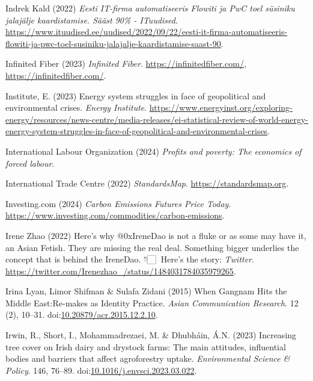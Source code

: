 \documentclass[
  letterpaper,
  DIV=11,
  numbers=noendperiod]{scrartcl}
\newlength{\cslhangindent}
\newenvironment{CSLReferences}[2] %
 {\begin{list}{}{%
  \setlength{\itemindent}{0pt}
  \setlength{\leftmargin}{0pt}
  \setlength{\parsep}{0pt}
  \ifodd #1
   \setlength{\leftmargin}{\cslhangindent}
   \setlength{\itemindent}{-1\cslhangindent}
  \fi
  \setlength{\itemsep}{#2\baselineskip}}}
 {\end{list}}
\begin{document}
\begin{CSLReferences}{0}{1}
Indrek Kald (2022) \emph{Eesti {IT-firma} automatiseeris {Flowiti} ja
{PwC} toel s{ü}siniku jalaj{ä}lje kaardistamise. {S{ä}{ä}st} 90\% -
{ITuudised}}.
\url{https://www.ituudised.ee/uudised/2022/09/22/eesti-it-firma-automatiseeris-flowiti-ja-pwc-toel-susiniku-jalajalje-kaardistamise-saast-90}.

Infinited Fiber (2023) \emph{Infinited {Fiber}}.
\href{https://infinitedfiber.com/,\%20https://infinitedfiber.com/}{https://infinitedfiber.com/,
https://infinitedfiber.com/}.

Institute, E. (2023) Energy system struggles in face of geopolitical and
environmental crises. \emph{Energy Institute}.
\url{https://www.energyinst.org/exploring-energy/resources/news-centre/media-releases/ei-statistical-review-of-world-energy-energy-system-struggles-in-face-of-geopolitical-and-environmental-crises}.

International Labour Organization (2024) \emph{Profits and poverty:
{The} economics of forced labour}.

International Trade Centre (2022) \emph{{StandardsMap}}.
\url{https://standardsmap.org}.

Investing.com (2024) \emph{Carbon {Emissions Futures Price Today}}.
\url{https://www.investing.com/commodities/carbon-emissions}.

Irene Zhao (2022) Here's why @{0xIreneDao} is not a fluke or as some may
have it, an {Asian Fetish}. {They} are missing the real deal.
{Something} bigger underlies the concept that is behind the {IreneDao}.
👇🏻🧵 {Here}'s the story: \emph{Twitter}.
\url{https://twitter.com/Irenezhao_/status/1484031784035979265}.

Irina Lyan, Limor Shifman \& Sulafa Zidani (2015) When {Gangnam Hits}
the {Middle East}:{Re-makes} as {Identity Practice}. \emph{Asian
Communication Research}. 12 (2), 10--31.
doi:\href{https://doi.org/10.20879/acr.2015.12.2.10}{10.20879/acr.2015.12.2.10}.

Irwin, R., Short, I., Mohammadrezaei, M. \& Dhubháin, Á.N. (2023)
Increasing tree cover on {Irish} dairy and drystock farms: {The} main
attitudes, influential bodies and barriers that affect agroforestry
uptake. \emph{Environmental Science \& Policy}. 146, 76--89.
doi:\href{https://doi.org/10.1016/j.envsci.2023.03.022}{10.1016/j.envsci.2023.03.022}.


\end{CSLReferences}
\end{document}
